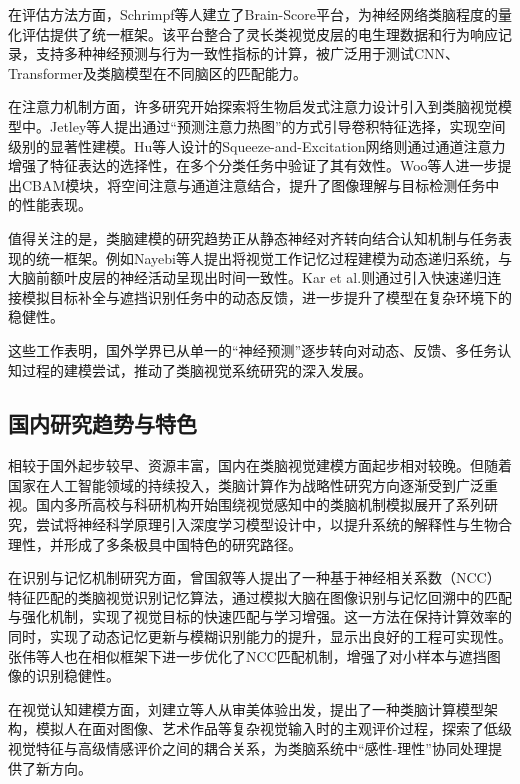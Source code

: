 在评估方法方面，Schrimpf等人建立了Brain-Score平台，为神经网络类脑程度的量化评估提供了统一框架。该平台整合了灵长类视觉皮层的电生理数据和行为响应记录，支持多种神经预测与行为一致性指标的计算，被广泛用于测试CNN、Transformer及类脑模型在不同脑区的匹配能力\cite{schrimpf2018brain}。

在注意力机制方面，许多研究开始探索将生物启发式注意力设计引入到类脑视觉模型中。Jetley等人提出通过“预测注意力热图”的方式引导卷积特征选择，实现空间级别的显著性建模\cite{jetley2018learn}。Hu等人设计的Squeeze-and-Excitation网络则通过通道注意力增强了特征表达的选择性，在多个分类任务中验证了其有效性\cite{hu2018squeeze}。Woo等人进一步提出CBAM模块，将空间注意与通道注意结合，提升了图像理解与目标检测任务中的性能表现\cite{woo2018cbam}。

值得关注的是，类脑建模的研究趋势正从静态神经对齐转向结合认知机制与任务表现的统一框架。例如Nayebi等人提出将视觉工作记忆过程建模为动态递归系统，与大脑前额叶皮层的神经活动呈现出时间一致性\cite{nayebi2018task}。Kar et al.则通过引入快速递归连接模拟目标补全与遮挡识别任务中的动态反馈，进一步提升了模型在复杂环境下的稳健性\cite{kar2019evidence}。

这些工作表明，国外学界已从单一的“神经预测”逐步转向对动态、反馈、多任务认知过程的建模尝试，推动了类脑视觉系统研究的深入发展。


\subsection{国内研究趋势与特色}

相较于国外起步较早、资源丰富，国内在类脑视觉建模方面起步相对较晚。但随着国家在人工智能领域的持续投入，类脑计算作为战略性研究方向逐渐受到广泛重视。国内多所高校与科研机构开始围绕视觉感知中的类脑机制模拟展开了系列研究，尝试将神经科学原理引入深度学习模型设计中，以提升系统的解释性与生物合理性，并形成了多条极具中国特色的研究路径。

在识别与记忆机制研究方面，曾国叙等人提出了一种基于神经相关系数（NCC）特征匹配的类脑视觉识别记忆算法，通过模拟大脑在图像识别与记忆回溯中的匹配与强化机制，实现了视觉目标的快速匹配与学习增强。这一方法在保持计算效率的同时，实现了动态记忆更新与模糊识别能力的提升，显示出良好的工程可实现性\cite{曾国叙2021ncc}。张伟等人也在相似框架下进一步优化了NCC匹配机制，增强了对小样本与遮挡图像的识别稳健性\cite{DNBC202503043}。

在视觉认知建模方面，刘建立等人从审美体验出发，提出了一种类脑计算模型架构，模拟人在面对图像、艺术作品等复杂视觉输入时的主观评价过程，探索了低级视觉特征与高级情感评价之间的耦合关系，为类脑系统中“感性-理性”协同处理提供了新方向\cite{刘建立2019视觉审美体验的类脑计算模型研究进展}。

